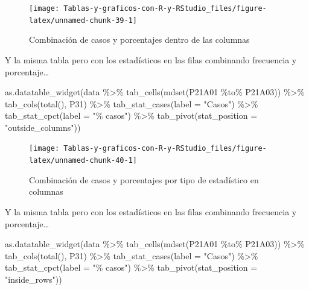 \documentclass[
]{book}
\newenvironment{Shaded}{\begin{snugshade}}{\end{snugshade}}
\newcommand{\AttributeTok}[1]{\textcolor[rgb]{0.77,0.63,0.00}{#1}}
\newcommand{\FunctionTok}[1]{\textcolor[rgb]{0.00,0.00,0.00}{#1}}
\newcommand{\NormalTok}[1]{#1}
\newcommand{\SpecialCharTok}[1]{\textcolor[rgb]{0.00,0.00,0.00}{#1}}
\newcommand{\StringTok}[1]{\textcolor[rgb]{0.31,0.60,0.02}{#1}}
\begin{document}
\begin{figure}[H]

{\centering \texttt{[image: Tablas-y-graficos-con-R-y-RStudio\_files/figure-latex/unnamed-chunk-39-1]} 

}

\caption{Combinación de casos y porcentajes dentro de las columnas}\label{fig:unnamed-chunk-39}
\end{figure}

Y la misma tabla pero con los estadísticos en las filas combinando frecuencia y porcentaje\ldots{}

\begin{Shaded}
\begin{Highlighting}[]
\FunctionTok{as.datatable\_widget}\NormalTok{(data }\SpecialCharTok{\%\textgreater{}\%}
  \FunctionTok{tab\_cells}\NormalTok{(}\FunctionTok{mdset}\NormalTok{(P21A01 }\SpecialCharTok{\%to\%}\NormalTok{ P21A03)) }\SpecialCharTok{\%\textgreater{}\%}
  \FunctionTok{tab\_cols}\NormalTok{(}\FunctionTok{total}\NormalTok{(), P31) }\SpecialCharTok{\%\textgreater{}\%}
  \FunctionTok{tab\_stat\_cases}\NormalTok{(}\AttributeTok{label =} \StringTok{"Casos"}\NormalTok{) }\SpecialCharTok{\%\textgreater{}\%}
  \FunctionTok{tab\_stat\_cpct}\NormalTok{(}\AttributeTok{label =} \StringTok{"\% casos"}\NormalTok{) }\SpecialCharTok{\%\textgreater{}\%}
  \FunctionTok{tab\_pivot}\NormalTok{(}\AttributeTok{stat\_position =} \StringTok{"outside\_columns"}\NormalTok{))}
\end{Highlighting}
\end{Shaded}

\begin{figure}[H]

{\centering \texttt{[image: Tablas-y-graficos-con-R-y-RStudio\_files/figure-latex/unnamed-chunk-40-1]} 

}

\caption{Combinación de casos y porcentajes por tipo de estadístico en columnas}\label{fig:unnamed-chunk-40}
\end{figure}

Y la misma tabla pero con los estadísticos en las filas combinando frecuencia y porcentaje\ldots{}

\begin{Shaded}
\begin{Highlighting}[]
\FunctionTok{as.datatable\_widget}\NormalTok{(data }\SpecialCharTok{\%\textgreater{}\%}
  \FunctionTok{tab\_cells}\NormalTok{(}\FunctionTok{mdset}\NormalTok{(P21A01 }\SpecialCharTok{\%to\%}\NormalTok{ P21A03)) }\SpecialCharTok{\%\textgreater{}\%}
  \FunctionTok{tab\_cols}\NormalTok{(}\FunctionTok{total}\NormalTok{(), P31) }\SpecialCharTok{\%\textgreater{}\%}
  \FunctionTok{tab\_stat\_cases}\NormalTok{(}\AttributeTok{label =} \StringTok{"Casos"}\NormalTok{) }\SpecialCharTok{\%\textgreater{}\%}
  \FunctionTok{tab\_stat\_cpct}\NormalTok{(}\AttributeTok{label =} \StringTok{"\% casos"}\NormalTok{) }\SpecialCharTok{\%\textgreater{}\%}
  \FunctionTok{tab\_pivot}\NormalTok{(}\AttributeTok{stat\_position =} \StringTok{"inside\_rows"}\NormalTok{))}
\end{Highlighting}
\end{Shaded}
\end{document}
